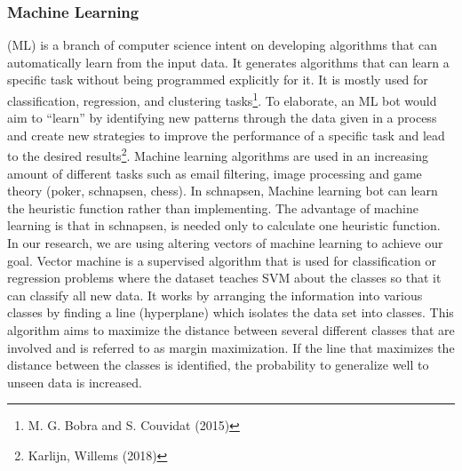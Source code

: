 \documentclass[master]{subfiles}
\begin{document}
\subsubsection{Machine Learning}
(ML) is a branch of computer science intent on developing algorithms that can automatically learn from the input data. It generates algorithms that can learn a specific task without being programmed explicitly for it. It is mostly used for classification, regression, and clustering tasks\footnote{M. G. Bobra and S. Couvidat (2015)}. To elaborate, an ML bot would aim to “learn” by identifying new patterns through the data given in a process and create new strategies to improve the performance of a specific task and lead to the desired results\footnote{Karlijn, Willems (2018)}. Machine learning algorithms are used in an increasing amount of different tasks such as email filtering, image processing and game theory (poker, schnapsen, chess). In schnapsen, Machine learning bot can learn the heuristic function rather than implementing. The advantage of machine learning is that in schnapsen, is needed only to calculate one heuristic function. \\
In our research, we are using altering vectors of machine learning to achieve our goal. Vector machine is a supervised algorithm that is used for classification or regression problems where the dataset teaches SVM about the classes so that it can classify all new data. It works by arranging the information into various classes by finding a line (hyperplane) which isolates the data set into classes. This algorithm aims to maximize the distance between several different classes that are involved and is referred to as margin maximization. If the line that maximizes the distance between the classes is identified, the probability to generalize well to unseen data is increased. \\
\end{document}
